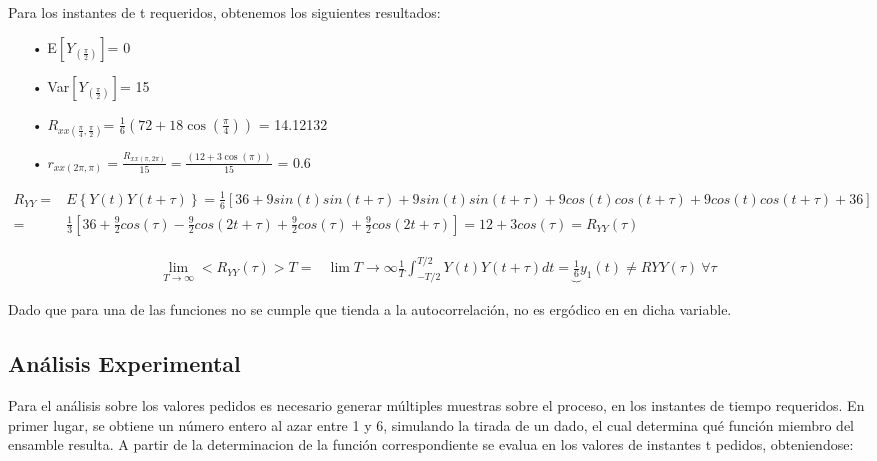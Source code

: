Para los instantes de t requeridos, obtenemos los siguientes resultados:
\begin{enumerate}
	\item[•]E$\left[ Y_{(\frac{\pi}{2})}\right]$= 0 
	\item[•]Var$\left[Y_{(\frac{\pi}{2})}\right]$= 15
	\item[•]$R_{xx(\frac{\pi}{4},\frac{\pi}{2})}$= $\frac{1}{6} (72 + 18 \cos(\frac{\pi}{4}))$ = 14.12132
	\item[•]$r_{xx(2\pi,\pi)} = \frac{R_{xx(\pi,2\pi)}}{15} = \frac{ (12 + 3 \cos(\pi))}{15}$ = 0.6
\end{enumerate}

\begin{equation*}
\begin{split}
	R_{YY} = & E \left\lbrace Y(t) Y(t + \tau) \right\rbrace = \frac{1}{6} \left[ 36 + 9 sin(t)sin(t + \tau) + 9 sin(t)sin(t + \tau) + 9 cos(t)cos(t + \tau) + 9 cos(t)cos(t + \tau) + 36 \right] \\
	= & \frac{1}{3} \left[ 36 + \frac{9}{2} cos(\tau) - \frac{9}{2} cos(2t + \tau) + \frac{9}{2} cos(\tau) + \frac{9}{2} cos(2t + \tau) \right] = 12 + 3 cos(\tau) = R_{YY}(\tau)
\end{split}
\end{equation*}

\begin{equation*}
\begin{split}
	\lim_{T\to\infty} < R_{YY}(\tau) >T = & \lim{T\to\infty} \frac{1}{T} \int_{-T/2}^{T/2} Y(t) Y(t + \tau) dt = \underbrace{\frac{1}{6}}{y_1(t)} \neq R{YY}(\tau) \ 	\forall \tau
\end{split}
\end{equation*}

Dado que para una de las funciones no se cumple que tienda a la autocorrelación, no es ergódico en en dicha variable.\\


\subsection{Análisis Experimental}

Para el análisis sobre los valores pedidos es necesario generar múltiples muestras sobre el proceso, en los instantes de tiempo requeridos. En primer lugar, se obtiene un número entero al azar entre 1 y 6, simulando la tirada de un dado, el cual determina qué función miembro del ensamble resulta.
A partir de la determinacion de la función correspondiente se evalua en los valores de instantes t pedidos, obteniendose:

